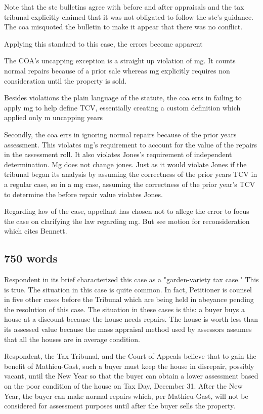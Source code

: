 \documentclass[12pt,\documentclassflag]{michiganCourtOfAppealsBrief}
\begin{document}
Note that the stc bulletins agree with before and after appraisals and the tax tribunal explicitly claimed that it was not obligated to follow the stc’s guidance. The coa misquoted the bulletin to make it appear that there was no conflict.

Applying this standard to this case, the errors become apparent

The COA’s uncapping exception is a straight up violation of mg. It counts normal repairs because of a prior sale whereas mg explicitly requires non consideration until the property is sold.

Besides violations the plain language of the statute, the coa errs in failing to apply mg to help define TCV, essentially creating a custom definition which applied only m uncapping years

Secondly, the coa errs in ignoring normal repairs because of the prior years assessment. This violates mg’s requirement to account for the value of the repairs in the assessment roll. It also violates Jones’s requirement of independent determination. Mg does not change jones. Just as it would violate Jones if the tribunal began its analysis by assuming the correctness of the prior years TCV in a regular case, so in a mg case, assuming the correctness of the prior year’s TCV to determine the before repair value violates Jones.

Regarding law of the case, appellant has chosen not to allege the error to focus the case on clarifying the law regarding mg. But see motion for reconsideration which cites Bennett.

\subsection{750 words}
Respondent in its brief characterized this case as a "garden-variety tax case." This is true. The situation in this case is quite common. In fact, Petitioner is counsel in five other cases before the Tribunal which are being held in abeyance pending the resolution of this case. The situation in these cases is this: a buyer buys a house at a discount because the house needs repairs. The house is worth less than its assessed value because the mass appraisal method used by assessors assumes that all the houses are in average condition.

Respondent, the Tax Tribunal, and the Court of Appeals believe that to gain the benefit of Mathieu-Gast, such a buyer must keep the house in disrepair, possibly vacant, until the New Year so that the buyer can obtain a lower assessment based on the poor condition of the house on Tax Day, December 31. After the New Year, the buyer can make normal repairs which, per Mathieu-Gast, will not be considered for assessment purposes until after the buyer sells the property.
\end{document}
